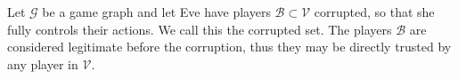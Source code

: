 {}
\begin{definition}
  Let $\mathcal{G}$ be a game graph and let Eve have players $\mathcal{B} \subset \mathcal{V}$ corrupted, so that she fully
  controls their actions. We call this the corrupted set. The players $\mathcal{B}$ are considered legitimate before the
  corruption, thus they may be directly trusted by any player in $\mathcal{V}$.
\end{definition}
